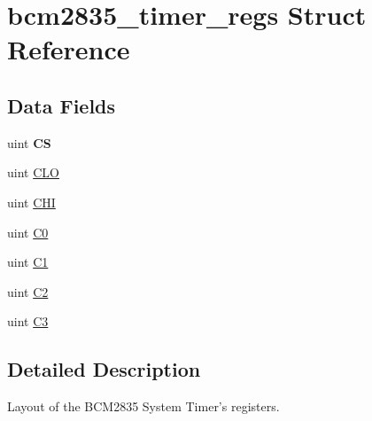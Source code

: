 \hypertarget{structbcm2835__timer__regs}{\section{bcm2835\-\_\-timer\-\_\-regs Struct Reference}
\label{structbcm2835__timer__regs}
}
\subsection*{Data Fields}
\begin{DoxyCompactItemize}
\item 
\hypertarget{structbcm2835__timer__regs_a2a1128b6cfb85ae4009ac5c58cf03632}{uint {\bfseries C\-S}}\label{structbcm2835__timer__regs_a2a1128b6cfb85ae4009ac5c58cf03632}

\item 
uint \hyperlink{structbcm2835__timer__regs_a744e7ce6232cea0977a51428d42dc20a}{C\-L\-O}
\item 
uint \hyperlink{structbcm2835__timer__regs_a7e46f963b2a885c1509669e92d4ae172}{C\-H\-I}
\item 
uint \hyperlink{structbcm2835__timer__regs_aa6325a3d70a2699ba480cded96f7dea1}{C0}
\item 
uint \hyperlink{structbcm2835__timer__regs_a250bb05291838b608e985f641566f81e}{C1}
\item 
uint \hyperlink{structbcm2835__timer__regs_a69ec03747d89bbfd4dfc86fd9673fcfc}{C2}
\item 
uint \hyperlink{structbcm2835__timer__regs_ac67e381282c34f5b84ce4be1dbb90aff}{C3}
\end{DoxyCompactItemize}


\subsection{Detailed Description}
Layout of the B\-C\-M2835 System Timer's registers. 

